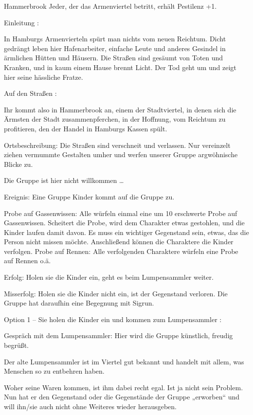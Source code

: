 




Hammerbrook
Jeder, der das Armenviertel betritt, erhält Pestilenz +1.

Einleitung
:

In Hamburgs Armenvierteln spürt man nichts vom neuen Reichtum. Dicht gedrängt leben hier Hafenarbeiter, einfache Leute und anderes Gesindel in ärmlichen Hütten und Häusern. Die Straßen sind gesäumt von Toten und Kranken, und in kaum einem Hause brennt Licht. Der Tod geht um und zeigt hier seine hässliche Fratze.

Auf den Straßen
:

Ihr kommt also in Hammerbrook an, einem der Stadtviertel, in denen sich die Ärmsten der Stadt zusammenpferchen, in der Hoffnung, vom Reichtum zu profitieren, den der Handel in Hamburgs Kassen spült.

Ortsbeschreibung: Die Straßen sind verschneit und verlassen. Nur vereinzelt ziehen vermummte Gestalten umher und werfen unserer Gruppe argwöhnische Blicke zu.

Die Gruppe ist hier nicht willkommen …

Ereignis: Eine Gruppe Kinder kommt auf die Gruppe zu.

Probe auf Gassenwissen:
Alle würfeln einmal eine um 10 erschwerte Probe auf Gassenwissen.
Scheitert die Probe, wird dem Charakter etwas gestohlen, und die Kinder laufen damit davon. Es muss ein wichtiger Gegenstand sein, etwas, das die Person nicht missen möchte.
Anschließend können die Charaktere die Kinder verfolgen.
Probe auf Rennen:
Alle verfolgenden Charaktere würfeln eine Probe auf Rennen o.ä.

Erfolg: Holen sie die Kinder ein, geht es beim Lumpensammler weiter.

Misserfolg: Holen sie die Kinder nicht ein, ist der Gegenstand verloren.
Die Gruppe hat daraufhin eine Begegnung mit Sigrun.

Option 1 – Sie holen die Kinder ein und kommen zum Lumpensammler
:

Gespräch mit dem Lumpensammler: Hier wird die Gruppe künstlich, freudig begrüßt.

Der alte Lumpensammler ist im Viertel gut bekannt und handelt mit allem, was Menschen so zu entbehren haben.

Woher seine Waren kommen, ist ihm dabei recht egal. Ist ja nicht sein Problem. Nun hat er den Gegenstand oder die Gegenstände der Gruppe „erworben“ und will ihn/sie auch nicht ohne Weiteres wieder herausgeben.

